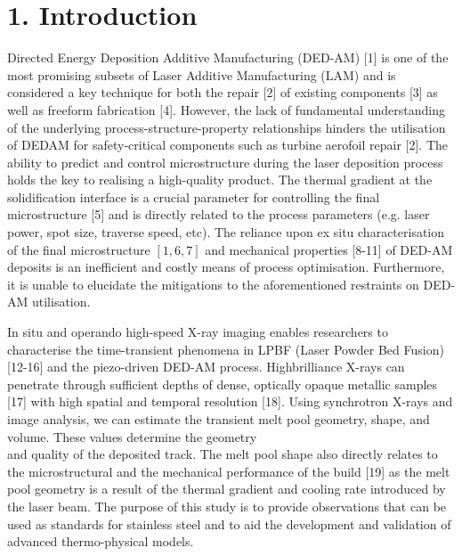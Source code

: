 \documentclass[10pt]{article}
\begin{document}
\section*{1. Introduction}
Directed Energy Deposition Additive Manufacturing (DED-AM) [1] is one of the most promising subsets of Laser Additive Manufacturing (LAM) and is considered a key technique for both the repair [2] of existing components [3] as well as freeform fabrication [4]. However, the lack of fundamental understanding of the underlying process-structure-property relationships hinders the utilisation of DEDAM for safety-critical components such as turbine aerofoil repair [2]. The ability to predict and control microstructure during the laser deposition process holds the key to realising a high-quality product. The thermal gradient at the solidification interface is a crucial parameter for controlling the final microstructure [5] and is directly related to the process parameters (e.g. laser power, spot size, traverse speed, etc). The reliance upon ex situ characterisation of the final microstructure $[1,6,7]$ and mechanical properties [8-11] of DED-AM deposits is an inefficient and costly means of process optimisation. Furthermore, it is unable to elucidate the mitigations to the aforementioned restraints on DED-AM utilisation.

In situ and operando high-speed X-ray imaging enables researchers to characterise the time-transient phenomena in LPBF (Laser Powder Bed Fusion) [12-16] and the piezo-driven DED-AM process. Highbrilliance X-rays can penetrate through sufficient depths of dense, optically opaque metallic samples [17] with high spatial and temporal resolution [18]. Using synchrotron X-rays and image analysis, we can estimate the transient melt pool geometry, shape, and volume. These values determine the geometry\\
and quality of the deposited track. The melt pool shape also directly relates to the microstructural and the mechanical performance of the build [19] as the melt pool geometry is a result of the thermal gradient and cooling rate introduced by the laser beam. The purpose of this study is to provide observations that can be used as standards for stainless steel and to aid the development and validation of advanced thermo-physical models.
\end{document}
